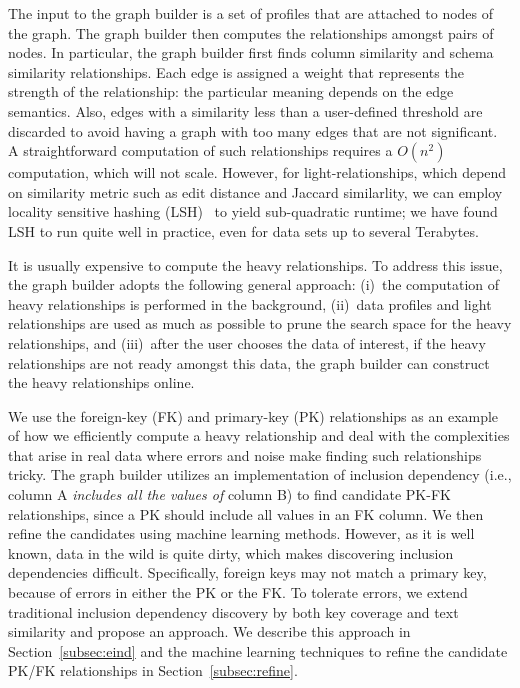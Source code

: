 The input to the graph builder is a set of profiles that are attached to nodes
of the graph.  The graph builder then computes the relationships amongst pairs of
nodes. In particular, the graph builder first finds column similarity and
schema similarity relationships.  Each edge is assigned a weight that represents
the strength of the relationship: the particular meaning depends on the edge
semantics.  Also, edges with a similarity less than a user-defined threshold are
discarded to avoid having a graph with too many edges that are not significant.
A straightforward computation of such relationships requires a $O(n^2)$
computation, which will not scale.  However, for light-relationships, which depend on similarity metric
such as edit distance and Jaccard similarlity, we can employ locality sensitive hashing
(LSH)~\cite{DBLP:conf/compgeom/DatarIIM04} to yield sub-quadratic runtime; we have found LSH to run quite well in practice, even for data sets up to several Terabytes.

It is usually expensive to compute the heavy relationships. To address this
issue, the graph builder adopts the following general approach: (i)~the
computation of heavy relationships is performed in the background, (ii)~data
profiles and light relationships are used as much as possible to prune the
search space for the heavy relationships, and (iii)~after the user chooses the data of
interest, if the heavy relationships are not ready amongst this data, the graph builder can construct the heavy relationships online.

We use the foreign-key (FK) and primary-key (PK) relationships as an example of how
we efficiently compute a heavy relationship and deal with the complexities that arise in real data where errors and noise make finding
such relationships tricky. The graph builder utilizes an
implementation of inclusion dependency (i.e., column A {\it includes all the values of} column B) to find candidate PK-FK relationships, since a PK should include all values in an FK column.  We then 
 refine the candidates using machine learning methods. However,
as it is well known, data in the wild is quite dirty, which makes discovering
inclusion dependencies difficult. Specifically, foreign keys may not match a
primary key, because of errors in either the PK or the FK. To tolerate errors,
we extend traditional inclusion dependency discovery by both key coverage and
text similarity and propose an \emph{\eind} approach. 
We describe this approach in Section~\ref{subsec:eind} and the machine learning
techniques to refine the candidate PK/FK relationships in Section~\ref{subsec:refine}.

